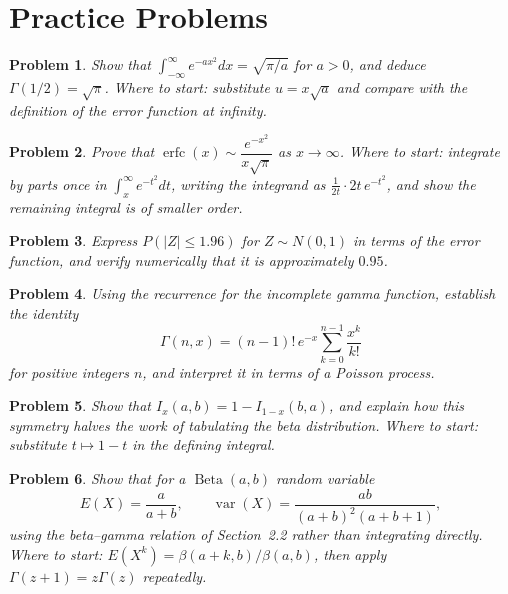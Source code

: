 \documentclass[12pt,a4paper]{report}
\theoremstyle{definition}
\theoremstyle{plain}
\newtheorem{problemx}{Problem}[section]
\newenvironment{problem}{\begin{problemx}}{\end{problemx}}
\begin{document}
\section{Practice Problems}

\begin{problem}
Show that $\displaystyle\int^{\infty}_{-\infty}e^{-a x^{2}}dx = \sqrt{\pi/a}$
for $a>0$, and deduce $\Gamma(1/2)=\sqrt{\pi}$.
\emph{Where to start: substitute $u = x\sqrt{a}$ and compare with the definition
of the error function at infinity.}
\end{problem}

\begin{problem}
Prove that $\operatorname{erfc}(x)\sim\dfrac{e^{-x^{2}}}{x\sqrt{\pi}}$ as
$x\to\infty$.
\emph{Where to start: integrate by parts once in
$\int^{\infty}_{x}e^{-t^{2}}dt$, writing the integrand as
$\frac{1}{2t}\cdot 2t\,e^{-t^{2}}$, and show the remaining integral is of
smaller order.}
\end{problem}

\begin{problem}
Express $P(|Z|\leq 1.96)$ for $Z\sim N(0,1)$ in terms of the error function, and
verify numerically that it is approximately $0.95$.
\end{problem}

\begin{problem}
Using the recurrence for the incomplete gamma function, establish the identity
$$\Gamma(n,x) = (n-1)!\,e^{-x}\sum^{n-1}_{k=0}\frac{x^{k}}{k!}$$
for positive integers $n$, and interpret it in terms of a Poisson process.
\end{problem}

\begin{problem}
Show that $I_x(a,b) = 1 - I_{1-x}(b,a)$, and explain how this symmetry halves
the work of tabulating the beta distribution.
\emph{Where to start: substitute $t\mapsto 1-t$ in the defining integral.}
\end{problem}

\begin{problem}
Show that for a $\operatorname{Beta}(a,b)$ random variable
$$E(X) = \frac{a}{a+b},\qquad
\operatorname{var}(X) = \frac{ab}{(a+b)^{2}(a+b+1)},$$
using the beta--gamma relation of Section~2.2 rather than integrating directly.
\emph{Where to start: $E(X^{k}) = \beta(a+k,b)/\beta(a,b)$, then apply
$\Gamma(z+1)=z\Gamma(z)$ repeatedly.}
\end{problem}
\end{document}
